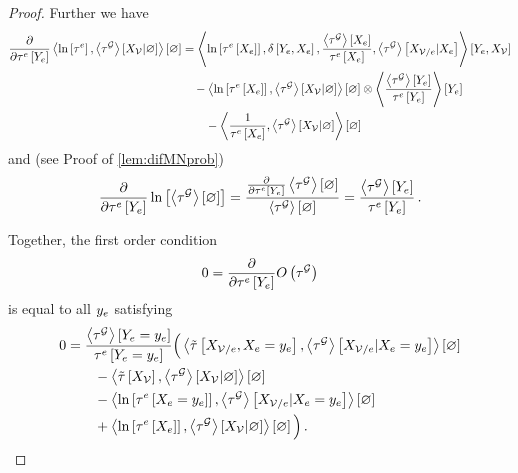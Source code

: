 \begin{proof}
    Further we have
    \begin{align*}
        \frac{\partial }{\partial \tau^{e}\left[Y_{e}\right]} \left\langle  \ln \left[ \tau^{e} \right], \left\langle \tau^{\mathcal{G}}\right\rangle \left[ X_{\mathcal{V}} | \varnothing \right]\right\rangle \left[ \varnothing \right]
        & = \left\langle \ln \left[ \tau^{e}\left[X_{e}\right] \right],
            \delta\left[Y_{e},X_{e}\right],
            \frac{\left\langle \tau^{\mathcal{G}}\right\rangle \left[ X_{e} \right]}{\tau^{e}\left[X_{e}\right]},
            \left\langle \tau^{\mathcal{G}}\right\rangle \left[ X_{\mathcal{V}/e} | X_{e} \right] \right\rangle \left[ Y_{e},X_{\mathcal{V}} \right] \\
        & \quad -  \left\langle \ln \left[ \tau^{e}\left[X_{e}\right] \right],\left\langle \tau^{\mathcal{G}}\right\rangle \left[ X_{\mathcal{V}} | \varnothing \right]\right\rangle \left[ \varnothing \right]
        \otimes \left\langle \frac{\left\langle \tau^{\mathcal{G}}\right\rangle \left[ Y_{e} \right]}{\tau^{e}\left[Y_{e}\right]}
        \right\rangle \left[ Y_{e} \right] \\
        & \quad\quad - \left\langle  \frac{1}{\tau^{e}\left[X_{e}\right]}, \left\langle \tau^{\mathcal{G}}\right\rangle \left[ X_{\mathcal{V}} | \varnothing \right]\right\rangle \left[ \varnothing \right]
    \end{align*}
    and (see Proof of \ref{lem:difMNprob})
    \begin{align*}
        \frac{\partial }{\partial \tau^{e}\left[Y_{e}\right]} \ln \left[ \left\langle \tau^{\mathcal{G}}\right\rangle \left[ \varnothing \right] \right]
        = \frac{\frac{\partial }{\partial \tau^{e}\left[Y_{e}\right]} \left\langle \tau^{\mathcal{G}}\right\rangle \left[ \varnothing \right]}{\left\langle \tau^{\mathcal{G}}\right\rangle \left[ \varnothing \right]}
        = \frac{\left\langle \tau^{\mathcal{G}}\right\rangle \left[ Y_{e} \right]}{\tau^{e}\left[Y_{e}\right]} \, .
    \end{align*}

    Together, the first order condition
    \begin{align*}
        0 = \frac{\partial }{\partial \tau^{e}\left[Y_{e}\right]} O\left(\tau^{\mathcal{G}}\right)
    \end{align*}
    is equal to all $y_{e}$ satisfying%
    \begin{align*}
        0 & = \frac{\left\langle \tau^{\mathcal{G}}\right\rangle \left[ Y_{e}=y_{e} \right]}{\tau^{e}\left[Y_{e}=y_{e}\right]}
        \Big(
        \left\langle \tilde{\tau}\left[X_{\mathcal{V}/e},X_{e}=y_{e}\right], \left\langle \tau^{\mathcal{G}}\right\rangle \left[ X_{\mathcal{V}/e} | X_{e}=y_{e} \right]\right\rangle \left[ \varnothing \right] \\
        &\quad \quad - \left\langle \tilde{\tau}\left[X_{\mathcal{V}}\right], \left\langle \tau^{\mathcal{G}}\right\rangle \left[ X_{\mathcal{V}} | \varnothing \right]\right\rangle \left[ \varnothing \right]  \\
        &\quad \quad - \left\langle \ln \left[ \tau^{e}\left[X_{e}=y_{e}\right] \right], \left\langle \tau^{\mathcal{G}}\right\rangle \left[ X_{\mathcal{V}/e} | X_{e}=y_{e} \right]\right\rangle \left[ \varnothing \right] \\
        &\quad \quad + \left\langle \ln \left[ \tau^{e}\left[X_{e}\right] \right], \left\langle \tau^{\mathcal{G}}\right\rangle \left[ X_{\mathcal{V}} | \varnothing \right]\right\rangle \left[ \varnothing \right]
        \Big) \, .
    \end{align*}


\end{proof}
